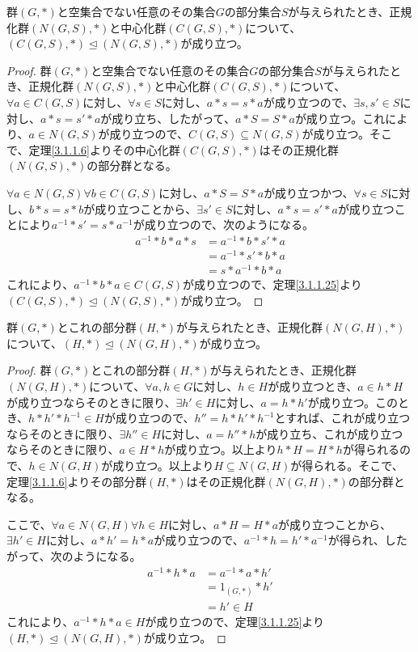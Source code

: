 \documentclass[dvipdfmx]{jsarticle}
\begin{document}
\begin{thm}\label{3.1.1.46}
群$(G,*)$と空集合でない任意のその集合$G$の部分集合$S$が与えられたとき、正規化群$\left( N(G,S),* \right)$と中心化群$\left( C(G,S),* \right)$について、$\left( C(G,S),* \right) \trianglelefteq \left( N(G,S),* \right)$が成り立つ。
\end{thm}
\begin{proof}
群$(G,*)$と空集合でない任意のその集合$G$の部分集合$S$が与えられたとき、正規化群$\left( N(G,S),* \right)$と中心化群$\left( C(G,S),* \right)$について、$\forall a \in C(G,S)$に対し、$\forall s \in S$に対し、$a*s = s*a$が成り立つので、$\exists s,s' \in S$に対し、$a*s = s'*a$が成り立ち、したがって、$a*S = S*a$が成り立つ。これにより、$a \in N(G,S)$が成り立つので、$C(G,S) \subseteq N(G,S)$が成り立つ。そこで、定理\ref{3.1.1.6}よりその中心化群$\left( C(G,S),* \right)$はその正規化群$\left( N(G,S),* \right)$の部分群となる。\par
$\forall a \in N(G,S)\forall b \in C(G,S)$に対し、$a*S = S*a$が成り立つかつ、$\forall s \in S$に対し、$b*s = s*b$が成り立つことから、$\exists s' \in S$に対し、$a*s = s'*a$が成り立つことにより$a^{- 1}*s' = s*a^{- 1}$が成り立つので、次のようになる。
\begin{align*}
a^{- 1}*b*a*s &= a^{- 1}*b*s'*a\\
&= a^{- 1}*s'*b*a\\
&= s*a^{- 1}*b*a
\end{align*}
これにより、$a^{- 1}*b*a \in C(G,S)$が成り立つので、定理\ref{3.1.1.25}より$\left( C(G,S),* \right) \trianglelefteq \left( N(G,S),* \right)$が成り立つ。
\end{proof}
\begin{thm}\label{3.1.1.47}
群$(G,*)$とこれの部分群$(H,*)$が与えられたとき、正規化群$\left( N(G,H),* \right)$について、$(H,*) \trianglelefteq \left( N(G,H),* \right)$が成り立つ。
\end{thm}
\begin{proof}
群$(G,*)$とこれの部分群$(H,*)$が与えられたとき、正規化群$\left( N(G,H),* \right)$について、$\forall a,h \in G$に対し、$h \in H$が成り立つとき、$a \in h*H$が成り立つならそのときに限り、$\exists h' \in H$に対し、$a = h*h'$が成り立つ。このとき、$h*h'*h^{- 1} \in H$が成り立つので、$h'' = h*h'*h^{- 1}$とすれば、これが成り立つならそのときに限り、$\exists h'' \in H$に対し、$a = h''*h$が成り立ち、これが成り立つならそのときに限り、$a \in H*h$が成り立つ。以上より$h*H = H*h$が得られるので、$h \in N(G,H)$が成り立つ。以上より$H \subseteq N(G,H)$が得られる。そこで、定理\ref{3.1.1.6}よりその部分群$(H,*)$はその正規化群$\left( N(G,H),* \right)$の部分群となる。\par
ここで、$\forall a \in N(G,H)\forall h \in H$に対し、$a*H = H*a$が成り立つことから、$\exists h' \in H$に対し、$a*h' = h*a$が成り立つので、$a^{- 1}*h = h'*a^{- 1}$が得られ、したがって、次のようになる。
\begin{align*}
a^{- 1}*h*a &= a^{- 1}*a*h'\\
&= 1_{(G,*)}*h'\\
&= h' \in H
\end{align*}
これにより、$a^{- 1}*h*a \in H$が成り立つので、定理\ref{3.1.1.25}より$(H,*) \trianglelefteq \left( N(G,H),* \right)$が成り立つ。
\end{proof}
\end{document}
